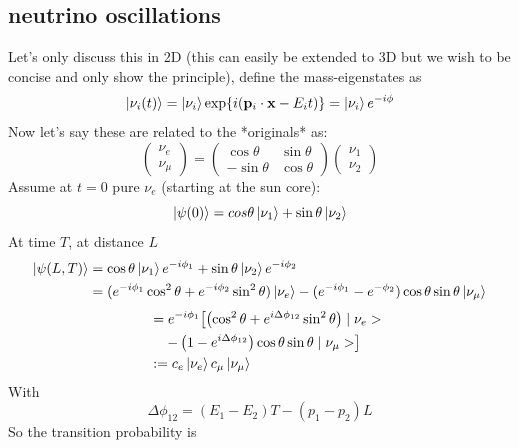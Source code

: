 \documentclass[11pt,a4paper,faculty=we,language=en,doctype=report]{cls/ugent-doc}
\begin{document}
\subsection{neutrino oscillations}
Let's only discuss this in 2D (this can easily be extended to 3D but we wish to be 
concise and only show the principle), define the mass-eigenstates as 
\begin{equation}
	\ket{\nu_i(t)} = \ket{\nu_i}\exp\{i(\mathbf{p}_i\cdot\mathbf{x} - E_i t)\} = \ket{\nu_i}e^{-i\phi}
\end{equation}
Now let's say these are related to the *originals* as:
\begin{equation}
	\left(\begin{matrix}\nu_e\\\nu_\mu\end{matrix}\right)=\left(\begin{matrix}\cos{\theta}&\sin{\theta}\\-\sin{\theta}&\cos{\theta}\end{matrix}\right)\left(\begin{matrix}\nu_1\\\nu_2\end{matrix}\right)
\end{equation}
Assume at $t=0$ pure $\nu_e$ (starting at the sun core):
\begin{equation}
	\ket{\psi(0)} = cos{\theta} \ket{\nu_1} + \sin{\theta}\ket{\nu_2}
\end{equation}
At time $T$, at distance $L$
\begin{align}
	\ket{\psi(L, T)} &= \cos{\theta} \ket{\nu_1}e^{-i \phi_1}+\sin{\theta}\ket{\nu_2}e^{-i \phi_2}\\
			 &= (e^{-i\phi_1}\cos^2{\theta} + e^{-i\phi_2}\sin^2{\theta})\ket{\nu_e} 
			 - (e^{-i\phi_1} - e^{-\phi_2})\cos{\theta}\sin{\theta}\ket{\nu_\mu}
\end{align}
\begin{align}
&\quad=e^{-i \phi_1} {\left[\left(\cos ^2 \theta+e^{i \Delta \phi_{12}} \sin ^2 \theta\right) \mid \nu_e>\right.} \\
&\qquad\left.-\left(1-e^{i \Delta \phi_{12}}\right) \cos \theta \sin \theta \mid \nu_\mu>\right]\\
&\quad:=c_e\ket{\nu_e} c_\mu\ket{\nu_\mu}
\end{align}
With
\begin{equation}
	\Delta \phi_{12}=\left(E_1-E_2\right) T-\left(p_1-p_2\right) L
\end{equation}
So the transition probability is
\end{document}
